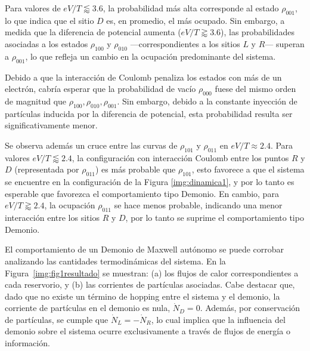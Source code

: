 Para valores de $eV/T \lessapprox 3.6$, la probabilidad más alta corresponde al estado $\rho_{001}$, lo que indica que el sitio $D$ es, en promedio, el más ocupado. Sin embargo, a medida que la diferencia de potencial aumenta ($eV/T \gtrapprox 3.6$), las probabilidades asociadas a los estados $\rho_{100}$ y $\rho_{010}$ —correspondientes a los sitios $L$ y $R$— superan a $\rho_{001}$, lo que refleja un cambio en la ocupación predominante del sistema.

Debido a que la interacción de Coulomb penaliza los estados con más de un electrón, cabría esperar que la probabilidad de vacío $\rho_{000}$ fuese del mismo orden de magnitud que $\rho_{100},\rho_{010},\rho_{001}$. Sin embargo, debido a la constante inyección de partículas inducida por la diferencia de potencial, esta probabilidad resulta ser significativamente menor. 

Se observa además un cruce entre las curvas de $\rho_{101}$ y $\rho_{011}$ en $eV/T \approx 2.4$. Para valores $eV/T \lessapprox 2.4$, la configuración con interacción Coulomb entre los puntos $R$ y $D$ (representada por $\rho_{011}$) es más probable que $\rho_{101}$, esto favorece a que el sistema se encuentre en la configuración de la Figura \ref{img:dinamica1}, y por lo tanto es esperable que favorezca el comportamiento tipo Demonio. En cambio, para $eV/T \gtrapprox 2.4$, la ocupación $\rho_{011}$ se hace menos probable, indicando una menor interacción entre los sitios $R$ y $D$, por lo tanto se suprime el comportamiento tipo Demonio.



El comportamiento de un Demonio de Maxwell autónomo se puede corrobar analizando las cantidades termodinámicas del sistema. En la Figura~\ref{img:fig1resultado} se muestran: (a) los flujos de calor correspondientes a cada reservorio, y (b) las corrientes de partículas asociadas. Cabe destacar que, dado que no existe un término de hopping entre el sistema y el demonio, la corriente de partículas en el demonio es nula, $\dot{N}_{D} = 0$. Además, por conservación de partículas, se cumple que $\dot{N}_{L} = -\dot{N}_{R}$, lo cual implica que la influencia del demonio sobre el sistema ocurre exclusivamente a través de flujos de energía o información.

